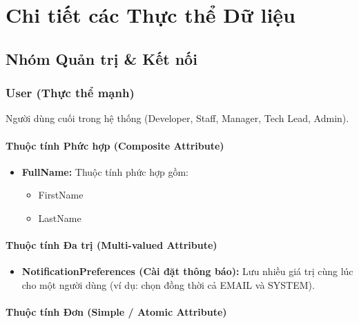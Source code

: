 \chapter{Chi tiết các Thực thể Dữ liệu}

\section{Nhóm Quản trị \& Kết nối}

\subsection{User (Thực thể mạnh)}

Người dùng cuối trong hệ thống (Developer, Staff, Manager, Tech Lead, Admin).

\subsubsection{Thuộc tính Phức hợp (Composite Attribute)}

\begin{itemize}
    \item \textbf{FullName:} Thuộc tính phức hợp gồm:
    \begin{itemize}
        \item FirstName
        \item LastName
    \end{itemize}
\end{itemize}

\subsubsection{Thuộc tính Đa trị (Multi-valued Attribute)}

\begin{itemize}
    \item \textbf{NotificationPreferences (Cài đặt thông báo):}
    Lưu nhiều giá trị cùng lúc cho một người dùng
    (ví dụ: chọn đồng thời cả EMAIL và SYSTEM).
\end{itemize}

\subsubsection{Thuộc tính Đơn (Simple / Atomic Attribute)}

